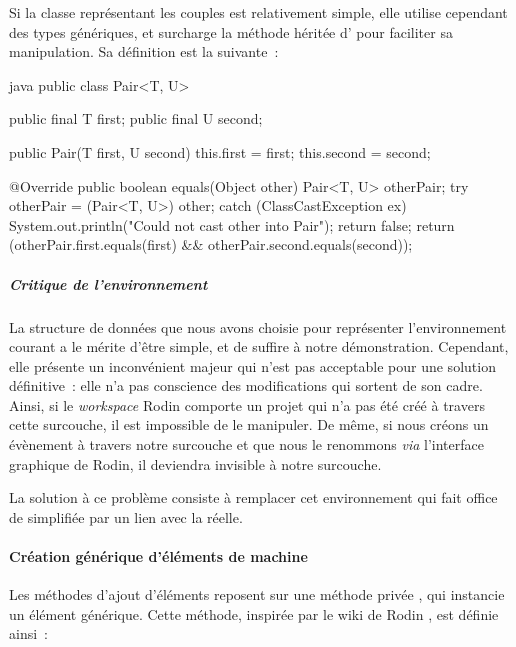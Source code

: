 Si la classe  représentant les couples est relativement simple, elle utilise cependant des types génériques, et surcharge la méthode  héritée %
d' pour faciliter sa manipulation.
Sa définition est la suivante~:

\begin{imtaCode}{java}
public class Pair<T, U> {
    public final T first;
    public final U second;

    public Pair(T first, U second) {
        this.first = first;
        this.second = second;
    }

    @Override
    public boolean equals(Object other) {
        Pair<T, U> otherPair;
        try {
            otherPair = (Pair<T, U>) other;
        } catch (ClassCastException ex) {
            System.out.println("Could not cast other into Pair");
            return false;
        }
        return (otherPair.first.equals(first) && otherPair.second.equals(second));
    }
}
\end{imtaCode}

\subparagraph*{Critique de l'environnement}
La structure de données que nous avons choisie pour représenter l'environnement courant a le mérite d'être simple, et de suffire à notre démonstration.
Cependant, elle présente un inconvénient majeur qui n'est pas acceptable pour une solution définitive~: elle n'a pas conscience des modifications qui sortent de son cadre.
Ainsi, si le \textit{workspace} Rodin comporte un projet qui n'a pas été créé à travers cette surcouche, il est impossible de le manipuler.
De même, si nous créons un évènement à travers notre surcouche et que nous le renommons \textit{via} l'interface graphique de Rodin, il deviendra invisible à notre surcouche.

La solution à ce problème consiste à remplacer cet environnement qui fait office de  simplifiée par un lien avec la  réelle.


\paragraph{Création générique d'éléments de machine}

Les méthodes d'ajout d'éléments reposent sur une méthode privée , qui instancie un élément générique.
Cette méthode, inspirée par le wiki de Rodin \cite{rodinwikicreateprojects}, est définie ainsi~:

